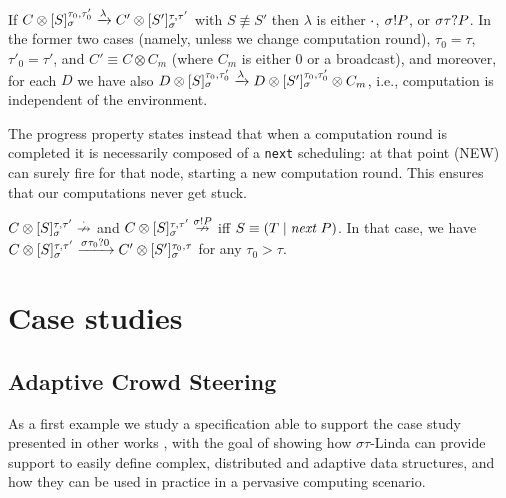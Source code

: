 \documentclass[12pt,a4paper,twoside,openright]{book}
\begin{document}
\begin{property}
If $C\otimes[ S ]_{\sigma}^{\tau_0,\tau'_0}\xrightarrow{\lambda}C'\otimes [ S' ]_{\sigma}^{\tau,\tau'}$ with $S\not\equiv S'$ then $\lambda$ is either $\cdot$, $\sigma!P$, or $\sigma\tau?P$.
%
In the former two cases (namely, unless we change computation round), $\tau_0=\tau$, $\tau'_0=\tau'$, and $C'\equiv C\otimes C_m$ (where $C_m$ is either $0$ or a broadcast), and moreover, for each $D$ we have also 
\mbox{$D\otimes[ S ]_{\sigma}^{\tau_0,\tau'_0}\xrightarrow{\lambda}D\otimes [ S' ]_{\sigma}^{\tau_0,\tau'_0}\otimes C_m$}, i.e., computation is independent of the environment.
\end{property}
\noindent The progress property states instead that when a computation round is completed it is necessarily composed of a \texttt{next} scheduling: at that point (NEW) can surely fire for that node, starting a new computation round. This ensures that our computations never get stuck.

\begin{property}
$C\otimes[ S ]_{\sigma}^{\tau,\tau'}\stackrel{\cdot}{\nrightarrow}$ and $C\otimes[ S ]_{\sigma}^{\tau,\tau'}\stackrel{\sigma!P}{\nrightarrow}$ iff $S\equiv(T\;|\;\textit{next}~P)$. In that case, we have $C\otimes[ S ]_{\sigma}^{\tau,\tau'}\xrightarrow{\sigma\tau_0?0}C'\otimes[ S' ]_{\sigma}^{\tau_0,\tau}$ for any $\tau_0>\tau$.
\end{property}

\section{Case studies}

\subsection{Adaptive Crowd Steering}

As a first example we study a specification able to support the case study presented in other works \cite{sapereecolaws-sac2012,mass2011}, with the goal of showing how $\sigma\tau$-Linda can provide support to easily define complex, distributed and adaptive data structures, and how they can be used in practice in a pervasive computing scenario.
\end{document}
